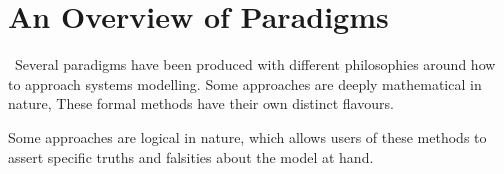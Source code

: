 \section{An Overview of Paradigms}\label{sec:paradigms}
~Several paradigms have been
produced with different philosophies around how to approach systems modelling.
Some approaches are deeply mathematical in nature, These formal methods have
their own distinct flavours.

Some approaches are logical in nature, which allows users of
these methods to assert specific truths and falsities about the model at hand.